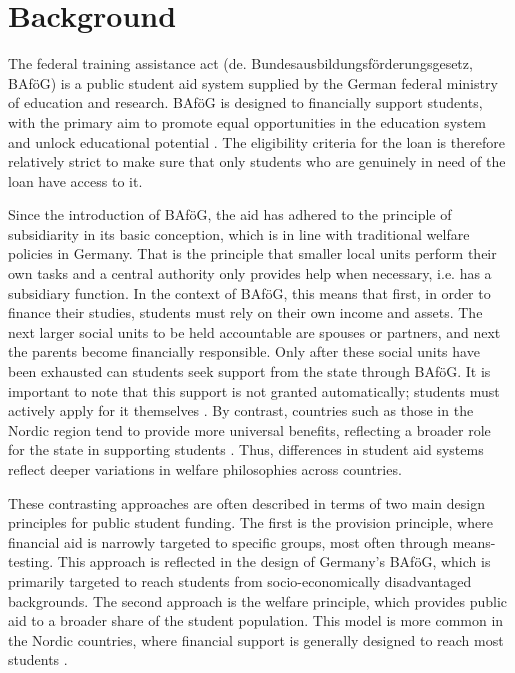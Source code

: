 
\section{Background}
\label{section:theoretical_empirical_context}

The federal training assistance act (de. Bundesausbildungsförderungsgesetz, BAföG) is a public student aid system supplied by the German federal ministry of education and research. BAföG is designed to financially support students, with the primary aim to promote equal opportunities in the education system and unlock educational potential \citep{meier_bafog_2024}. The eligibility criteria for the loan is therefore relatively strict to make sure that only students who are genuinely in need of the loan have access to it.

Since the introduction of BAföG, the aid has adhered to the principle of subsidiarity in its basic conception, which is in line with traditional welfare policies in Germany. 
That is the principle that smaller local units perform their own tasks and a central authority only provides help when necessary, i.e. has a subsidiary function. 
In the context of BAföG, this means that first, in order to finance their studies, students must rely on their own income and assets. 
The next larger social units to be held accountable are spouses or partners, and next the parents become financially responsible. 
Only after these social units have been exhausted can students seek support from the state through BAföG. 
It is important to note that this support is not granted automatically; students must actively apply for it themselves \citep{staack_von_2017}. 
By contrast, countries such as those in the Nordic region tend to provide more universal benefits, reflecting a broader role for the state in supporting students \citep{gwosc_krisenbewaltigung_2022, schwarz_study_2004}. 
Thus, differences in student aid systems reflect deeper variations in welfare philosophies across countries.

These contrasting approaches are often described in terms of two main design principles for public student funding. The first is the provision principle, where financial aid is narrowly targeted to specific groups, most often through means-testing. This approach is reflected in the design of Germany’s BAföG, which is primarily targeted to reach students from socio-economically disadvantaged backgrounds. The second approach is the welfare principle, which provides public aid to a broader share of the student population. This model is more common in the Nordic countries, where financial support is generally designed to reach most students \citep{gwosc_krisenbewaltigung_2022, oecd_education_2024}.

